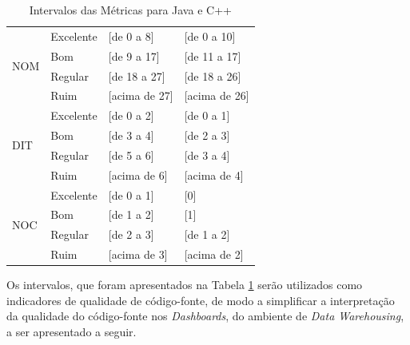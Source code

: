 \begin{table}[!ht]
\begin{center}
\begin{tabular}{ |l|l|l|l| }
		\multirow{4}{*}{NOM} 
		 & Excelente & [de 0 a 8] & [de 0 a 10] \\
		 & Bom & [de 9 a 17] & [de 11 a 17] \\
		 & Regular & [de 18 a 27] & [de 18 a 26] \\
		 & Ruim & [acima de 27] & [acima de 26] \\ \hline
		 
		\multirow{4}{*}{DIT} 
		 & Excelente & [de 0 a 2] & [de 0 a 1] \\
		 & Bom & [de 3 a 4] & [de 2 a 3] \\
		 & Regular & [de 5 a 6] & [de 3 a 4] \\
		 & Ruim & [acima de 6] & [acima de 4] \\ \hline
		
		\multirow{4}{*}{NOC} 
		 & Excelente & [de 0 a 1] & [0] \\
		 & Bom & [de 1 a 2] & [1] \\
		 & Regular & [de 2 a 3] & [de 1 a 2] \\
		 & Ruim & [acima de 3] & [acima de 2] \\ \hline
		 
	\end{tabular}
	\caption{Intervalos das Métricas para Java e C++}
	\label{metrics}
	\end{center}
	\end{table}
\FloatBarrier
	
Os intervalos, que foram apresentados na Tabela \ref{metrics} serão utilizados
como indicadores de qualidade de código-fonte, de modo a simplificar a 
interpretação da qualidade do código-fonte nos \textit{Dashboards}, do ambiente de \textit{Data Warehousing}, a ser apresentado a seguir.
